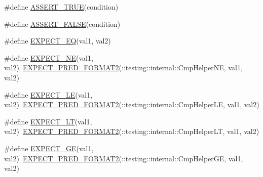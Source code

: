 \begin{DoxyCompactItemize}
\item 
\#define \mbox{\hyperlink{_obj__test_2lib_2googletest-release-1_88_81_2googletest_2include_2gtest_2gtest_8h_ae9244bfbda562e8b798789b001993fa5}{A\+S\+S\+E\+R\+T\+\_\+\+T\+R\+UE}}(condition)
\item 
\#define \mbox{\hyperlink{_obj__test_2lib_2googletest-release-1_88_81_2googletest_2include_2gtest_2gtest_8h_a8197fa52f3538588d20d8af4834c9003}{A\+S\+S\+E\+R\+T\+\_\+\+F\+A\+L\+SE}}(condition)
\item 
\#define \mbox{\hyperlink{_obj__test_2lib_2googletest-release-1_88_81_2googletest_2include_2gtest_2gtest_8h_a4159019abda84f5366acdb7604ff220a}{E\+X\+P\+E\+C\+T\+\_\+\+EQ}}(val1,  val2)
\item 
\#define \mbox{\hyperlink{_obj__test_2lib_2googletest-release-1_88_81_2googletest_2include_2gtest_2gtest_8h_a6ae7443947f25abc58bfcfcfc56b0d75}{E\+X\+P\+E\+C\+T\+\_\+\+NE}}(val1,  val2)~\mbox{\hyperlink{_obj__test_2lib_2googletest-release-1_88_81_2googletest_2include_2gtest_2gtest__pred__impl_8h_af0141918615a5e2d5247e9cda8324dae}{E\+X\+P\+E\+C\+T\+\_\+\+P\+R\+E\+D\+\_\+\+F\+O\+R\+M\+A\+T2}}(\+::testing\+::internal\+::\+Cmp\+Helper\+NE, val1, val2)
\item 
\#define \mbox{\hyperlink{_obj__test_2lib_2googletest-release-1_88_81_2googletest_2include_2gtest_2gtest_8h_ae0f265632323b4a07b585dcfde10f60a}{E\+X\+P\+E\+C\+T\+\_\+\+LE}}(val1,  val2)~\mbox{\hyperlink{_obj__test_2lib_2googletest-release-1_88_81_2googletest_2include_2gtest_2gtest__pred__impl_8h_af0141918615a5e2d5247e9cda8324dae}{E\+X\+P\+E\+C\+T\+\_\+\+P\+R\+E\+D\+\_\+\+F\+O\+R\+M\+A\+T2}}(\+::testing\+::internal\+::\+Cmp\+Helper\+LE, val1, val2)
\item 
\#define \mbox{\hyperlink{_obj__test_2lib_2googletest-release-1_88_81_2googletest_2include_2gtest_2gtest_8h_af28c06b2b5e8dee151896f299f6610cf}{E\+X\+P\+E\+C\+T\+\_\+\+LT}}(val1,  val2)~\mbox{\hyperlink{_obj__test_2lib_2googletest-release-1_88_81_2googletest_2include_2gtest_2gtest__pred__impl_8h_af0141918615a5e2d5247e9cda8324dae}{E\+X\+P\+E\+C\+T\+\_\+\+P\+R\+E\+D\+\_\+\+F\+O\+R\+M\+A\+T2}}(\+::testing\+::internal\+::\+Cmp\+Helper\+LT, val1, val2)
\item 
\#define \mbox{\hyperlink{_obj__test_2lib_2googletest-release-1_88_81_2googletest_2include_2gtest_2gtest_8h_ab7a0ff4bfa4d9b27baa118d8b0756ca0}{E\+X\+P\+E\+C\+T\+\_\+\+GE}}(val1,  val2)~\mbox{\hyperlink{_obj__test_2lib_2googletest-release-1_88_81_2googletest_2include_2gtest_2gtest__pred__impl_8h_af0141918615a5e2d5247e9cda8324dae}{E\+X\+P\+E\+C\+T\+\_\+\+P\+R\+E\+D\+\_\+\+F\+O\+R\+M\+A\+T2}}(\+::testing\+::internal\+::\+Cmp\+Helper\+GE, val1, val2)

\end{DoxyCompactItemize}
